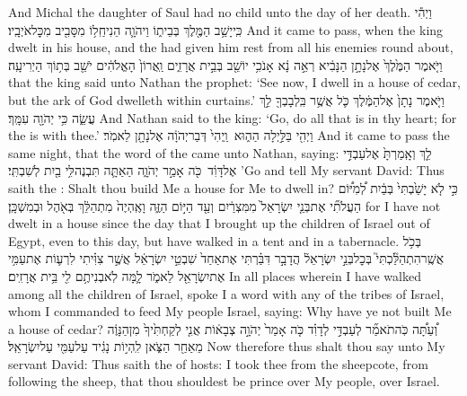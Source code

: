 {And Michal the daughter of Saul had no child unto the day of her death.}
\newperek
{}
{וַיְהִ֕י כִּֽי\maqqaf יָשַׁ֥ב הַמֶּ֖לֶךְ בְּבֵית֑וֹ וַיהֹוָ֛ה הֵנִיחַֽ\maqqaf ל֥וֹ מִסָּבִ֖יב מִכׇּל\maqqaf אֹיְבָֽיו׃}
{And it came to pass, when the king dwelt in his house, and the \lord\space had given him rest from all his enemies round about,}
{וַיֹּ֤אמֶר הַמֶּ֙לֶךְ֙ אֶל\maqqaf נָתָ֣ן הַנָּבִ֔יא רְאֵ֣ה נָ֔א אָנֹכִ֥י יוֹשֵׁ֖ב בְּבֵ֣ית אֲרָזִ֑ים וַֽאֲרוֹן֙ הָאֱלֹהִ֔ים יֹשֵׁ֖ב בְּת֥וֹךְ הַיְרִיעָֽה׃}
{that the king said unto Nathan the prophet: ‘See now, I dwell in a house of cedar, but the ark of God dwelleth within curtains.’}
{וַיֹּ֤אמֶר נָתָן֙ אֶל\maqqaf הַמֶּ֔לֶךְ כֹּ֛ל אֲשֶׁ֥ר בִּֽלְבָבְךָ֖ לֵ֣ךְ עֲשֵׂ֑ה כִּ֥י יְהֹוָ֖ה עִמָּֽךְ׃}
{And Nathan said to the king: ‘Go, do all that is in thy heart; for the \lord\space is with thee.’}
{וַיְהִ֖י בַּלַּ֣יְלָה הַה֑וּא \setuma  וַֽיְהִי֙ דְּבַר\maqqaf יְהֹוָ֔ה אֶל\maqqaf נָתָ֖ן לֵאמֹֽר׃}
{And it came to pass the same night, that the word of the \lord\space came unto Nathan, saying:}
{לֵ֤ךְ וְאָֽמַרְתָּ֙ אֶל\maqqaf עַבְדִּ֣י אֶל\maqqaf דָּוִ֔ד \setuma  כֹּ֖ה אָמַ֣ר יְהֹוָ֑ה הַאַתָּ֛ה תִּבְנֶה\maqqaf לִּ֥י בַ֖יִת לְשִׁבְתִּֽי׃}
{’Go and tell My servant David: Thus saith the \lord: Shalt thou build Me a house for Me to dwell in?}
{כִּ֣י לֹ֤א יָשַׁ֙בְתִּי֙ בְּבַ֔יִת לְ֠מִיּ֠וֹם הַעֲלֹתִ֞י אֶת\maqqaf בְּנֵ֤י יִשְׂרָאֵל֙ מִמִּצְרַ֔יִם וְעַ֖ד הַיּ֣וֹם הַזֶּ֑ה וָאֶֽהְיֶה֙ מִתְהַלֵּ֔ךְ בְּאֹ֖הֶל וּבְמִשְׁכָּֽן׃}
{for I have not dwelt in a house since the day that I brought up the children of Israel out of Egypt, even to this day, but have walked in a tent and in a tabernacle.}
{בְּכֹ֥ל אֲשֶֽׁר\maqqaf הִתְהַלַּ֘כְתִּי֮ בְּכׇל\maqqaf בְּנֵ֣י יִשְׂרָאֵל֒ הֲדָבָ֣ר דִּבַּ֗רְתִּי אֶת\maqqaf אַחַד֙ שִׁבְטֵ֣י יִשְׂרָאֵ֔ל אֲשֶׁ֣ר צִוִּ֗יתִי לִרְע֛וֹת אֶת\maqqaf עַמִּ֥י אֶת\maqqaf יִשְׂרָאֵ֖ל לֵאמֹ֑ר לָ֛מָּה לֹֽא\maqqaf בְנִיתֶ֥ם לִ֖י בֵּ֥ית אֲרָזִֽים׃}
{In all places wherein I have walked among all the children of Israel, spoke I a word with any of the tribes of Israel, whom I commanded to feed My people Israel, saying: Why have ye not built Me a house of cedar?}
{וְ֠עַתָּ֠ה כֹּֽה\maqqaf תֹאמַ֞ר לְעַבְדִּ֣י לְדָוִ֗ד כֹּ֤ה אָמַר֙ יְהֹוָ֣ה צְבָא֔וֹת אֲנִ֤י לְקַחְתִּ֙יךָ֙ מִן\maqqaf הַנָּוֶ֔ה מֵאַחַ֖ר הַצֹּ֑אן לִֽהְי֣וֹת נָגִ֔יד עַל\maqqaf עַמִּ֖י עַל\maqqaf יִשְׂרָאֵֽל׃}
{Now therefore thus shalt thou say unto My servant David: Thus saith the \lord\space of hosts: I took thee from the sheepcote, from following the sheep, that thou shouldest be prince over My people, over Israel.}
